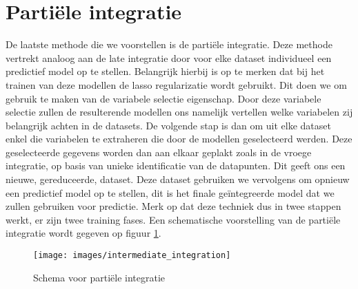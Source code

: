 \section{Parti\"ele integratie}
\label{sec:D:integratie-partieel}
De laatste methode die we voorstellen is de parti\"ele integratie. Deze methode vertrekt analoog aan de late integratie door voor elke dataset individueel een predictief model op te stellen. Belangrijk hierbij is op te merken dat bij het trainen van deze modellen de lasso regularizatie wordt gebruikt. Dit doen we om gebruik te maken van de variabele selectie eigenschap. Door deze variabele selectie zullen de resulterende modellen ons namelijk vertellen welke variabelen zij belangrijk achten in de datasets. De volgende stap is dan om uit elke dataset enkel die variabelen te extraheren die door de modellen geselecteerd werden. Deze geselecteerde gegevens worden dan aan elkaar geplakt zoals in de vroege integratie, op basis van unieke identificatie van de datapunten. Dit geeft ons een nieuwe, gereduceerde, dataset. Deze dataset gebruiken we vervolgens om opnieuw een predictief model op te stellen, dit is het finale ge\"integreerde model dat we zullen gebruiken voor predictie. Merk op dat deze techniek dus in twee stappen werkt, er zijn twee training fases. Een schematische voorstelling van de parti\"ele integratie wordt gegeven op figuur \ref{fig:D:integratie-partieel}.

\begin{figure}
	\centering
	\texttt{[image: images/intermediate\_integration]}
	\caption{Schema voor parti\"ele integratie}
	\label{fig:D:integratie-partieel}
\end{figure}

